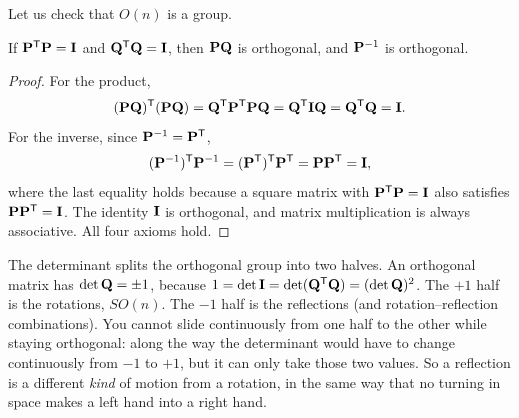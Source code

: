 Let us check that $O(n)$ is a group.

\begin{proposition}[$O(n)$ is a group]
\label{ch37:prop-ongroup}
If $\mathbf{P}^{\mathsf{T}}\mathbf{P}=\mathbf{I}$ and $\mathbf{Q}^{\mathsf{T}}\mathbf{Q}=\mathbf{I}$, then $\mathbf{PQ}$ is
orthogonal, and $\mathbf{P}^{-1}$ is orthogonal.
\end{proposition}

\begin{proof}
For the product,
\[
  (\mathbf{PQ})^{\mathsf{T}}(\mathbf{PQ}) = \mathbf{Q}^{\mathsf{T}}\mathbf{P}^{\mathsf{T}}\mathbf{P}\mathbf{Q}
  = \mathbf{Q}^{\mathsf{T}}\mathbf{I}\mathbf{Q} = \mathbf{Q}^{\mathsf{T}}\mathbf{Q} = \mathbf{I}.
\]
For the inverse, since $\mathbf{P}^{-1} = \mathbf{P}^{\mathsf{T}}$,
\[
  (\mathbf{P}^{-1})^{\mathsf{T}} \mathbf{P}^{-1} = (\mathbf{P}^{\mathsf{T}})^{\mathsf{T}}\mathbf{P}^{\mathsf{T}} = \mathbf{P}\mathbf{P}^{\mathsf{T}} = \mathbf{I},
\]
where the last equality
holds because a square matrix with $\mathbf{P}^{\mathsf{T}}\mathbf{P}=\mathbf{I}$ also satisfies
$\mathbf{P}\mathbf{P}^{\mathsf{T}}=\mathbf{I}$. The identity $\mathbf{I}$ is orthogonal, and matrix
multiplication is always associative. All four axioms hold.
\end{proof}

The determinant splits the orthogonal group into two halves. An
orthogonal matrix has $\det\mathbf{Q} = \pm 1$, because
$1 = \det\mathbf{I} = \det(\mathbf{Q}^{\mathsf{T}}\mathbf{Q}) = (\det\mathbf{Q})^2$. The $+1$ half is the
rotations, $SO(n)$. The $-1$ half is the
reflections (and rotation--reflection combinations). You cannot slide continuously
from one half to the other while staying orthogonal: along the way the determinant
would have to change continuously from $-1$ to $+1$, but it can only take those two
values. So a reflection is a different \emph{kind}
of motion from a rotation, in the same way that no turning in space makes a left
hand into a right hand.

